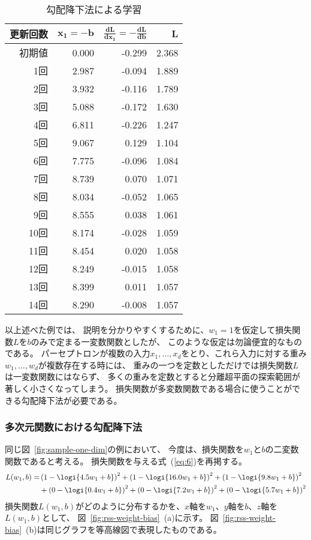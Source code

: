\begin{table}
  \centering
  \caption{勾配降下法による学習}
  \label{tab:gd-dim-one}
  \begin{tabular}{rrrr}
    \toprule
    \bf 更新回数 & \bf $\boldsymbol{x_1 = -b}$ & \bf $\boldsymbol{\frac{dL}{dx_1} = - \frac{dL}{db}}$ & \bf $\boldsymbol{L}$\\
    \midrule
初期値 & 0.000 & -0.299 & 2.368 \\
1回 & 2.987 & -0.094 & 1.889 \\
2回 & 3.932 & -0.116 & 1.789 \\
3回 & 5.088 & -0.172 & 1.630 \\
4回 & 6.811 & -0.226 & 1.247 \\
5回 & 9.067 & 0.129 & 1.104 \\
6回 & 7.775 & -0.096 & 1.084 \\
7回 & 8.739 & 0.070 & 1.071 \\
8回 & 8.034 & -0.052 & 1.065 \\
9回 & 8.555 & 0.038 & 1.061 \\
10回 & 8.174 & -0.028 & 1.059 \\
11回 & 8.454 & 0.020 & 1.058 \\
12回 & 8.249 & -0.015 & 1.058 \\
13回 & 8.399 & 0.011 & 1.057 \\
14回 & 8.290 & -0.008 & 1.057 \\
\bottomrule                                 
  \end{tabular}
\end{table}

以上述べた例では、
説明を分かりやすくするために、$w_1 = 1$を仮定して損失関数$L$を$b$のみで定まる一変数関数としたが、
このような仮定は勿論便宜的なものである。
パーセプトロンが複数の入力$x_1, \dots, x_d$をとり、これら入力に対する重み$w_1, \dots, w_d$が複数存在する時には、
重みの一つを定数としただけでは損失関数$L$は一変数関数にはならず、
多くの重みを定数とすると分離超平面の探索範囲が著しく小さくなってしまう。
損失関数が多変数関数である場合に使うことができる勾配降下法が必要である。

\subsubsection{多次元関数における勾配降下法}
\label{sec:gradient-descent-multi-variate}


同じ図~\ref{fig:sample-one-dim}の例において、
今度は、損失関数を$w_1$と$b$の二変数関数であると考える。
損失関数を与える式~(\ref{eq:6})を再掲する。
\begin{align*}
  L(w_1, b) =
  &\nonumber
    \left(1 - \logi{4.5 w_1 + b}\right)^2 + \left(1 - \logi{16.0 w_1 + b}\right)^2 + \left(1 - \logi{9.8 w_1 + b}\right)^2
  \\&
  + \left(0 - \logi{0.4 w_1 + b}\right)^2 + \left(0 - \logi{7.2 w_1 + b}\right)^2 + \left(0 - \logi{5.7 w_1 + b}\right)^2
\end{align*}
損失関数$L(w_1, b)$がどのように分布するかを、$x$軸を$w_1$、$y$軸を$b$、$z$軸を$L(w_1, b)$として、
図~\ref{fig:rss-weight-bias}~(a)に示す。
図~\ref{fig:rss-weight-bias}~(b)は同じグラフを等高線図で表現したものである。

